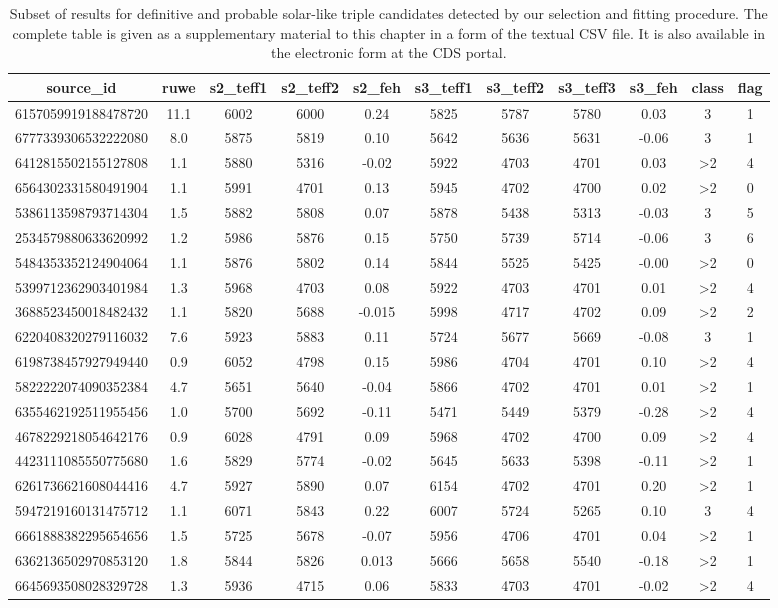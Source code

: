\begin{table}
	\centering
	\caption{Subset of results for definitive and probable solar-like triple candidates detected by our selection and fitting procedure. The complete table is given as a supplementary material to this chapter in a form of the textual CSV file. It is also available in the electronic form at the CDS portal.}
	\label{tab:out_triple}
	\begin{tabular}{c c c c c c c c c c c}
		\hline
		source\_id & ruwe & s2\_teff1 & s2\_teff2 & s2\_feh & s3\_teff1 & s3\_teff2 & s3\_teff3 & s3\_feh & class & flag \\
		\hline \hline
		6157059919188478720 & 11.1 & 6002 & 6000 & 0.24 & 5825 & 5787 & 5780 & 0.03 & 3 & 1 \\
		6777339306532222080 & 8.0 & 5875 & 5819 & 0.10 & 5642 & 5636 & 5631 & -0.06 & 3 & 1 \\
		6412815502155127808 & 1.1 & 5880 & 5316 & -0.02 & 5922 & 4703 & 4701 & 0.03 & >2 & 4 \\
		6564302331580491904 & 1.1 & 5991 & 4701 & 0.13 & 5945 & 4702 & 4700 & 0.02 & >2 & 0 \\
		5386113598793714304 & 1.5 & 5882 & 5808 & 0.07 & 5878 & 5438 & 5313 & -0.03 & 3 & 5 \\
		2534579880633620992 & 1.2 & 5986 & 5876 & 0.15 & 5750 & 5739 & 5714 & -0.06 & 3 & 6 \\
		5484353352124904064 & 1.1 & 5876 & 5802 & 0.14 & 5844 & 5525 & 5425 & -0.00 & >2 & 0 \\
		5399712362903401984 & 1.3 & 5968 & 4703 & 0.08 & 5922 & 4703 & 4701 & 0.01 & >2 & 4 \\
		3688523450018482432 & 1.1 & 5820 & 5688 & -0.015 & 5998 & 4717 & 4702 & 0.09 & >2 & 2 \\
		6220408320279116032 & 7.6 & 5923 & 5883 & 0.11 & 5724 & 5677 & 5669 & -0.08 & 3 & 1 \\
		6198738457927949440 & 0.9 & 6052 & 4798 & 0.15 & 5986 & 4704 & 4701 & 0.10 & >2 & 4 \\
		5822222074090352384 & 4.7 & 5651 & 5640 & -0.04 & 5866 & 4702 & 4701 & 0.01 & >2 & 1 \\
		6355462192511955456 & 1.0 & 5700 & 5692 & -0.11 & 5471 & 5449 & 5379 & -0.28 & >2 & 4 \\
		4678229218054642176 & 0.9 & 6028 & 4791 & 0.09 & 5968 & 4702 & 4700 & 0.09 & >2 & 4 \\
		4423111085550775680 & 1.6 & 5829 & 5774 & -0.02 & 5645 & 5633 & 5398 & -0.11 & >2 & 1 \\
		6261736621608044416 & 4.7 & 5927 & 5890 & 0.07 & 6154 & 4702 & 4701 & 0.20 & >2 & 1 \\
		5947219160131475712 & 1.1 & 6071 & 5843 & 0.22 & 6007 & 5724 & 5265 & 0.10 & 3 & 4 \\
		6661888382295654656 & 1.5 & 5725 & 5678 & -0.07 & 5956 & 4706 & 4701 & 0.04 & >2 & 1 \\
		6362136502970853120 & 1.8 & 5844 & 5826 & 0.013 & 5666 & 5658 & 5540 & -0.18 & >2 & 1 \\
		6645693508028329728 & 1.3 & 5936 & 4715 & 0.06 & 5833 & 4703 & 4701 & -0.02 & >2 & 4 \\
		\hline
	\end{tabular}
\end{table}
